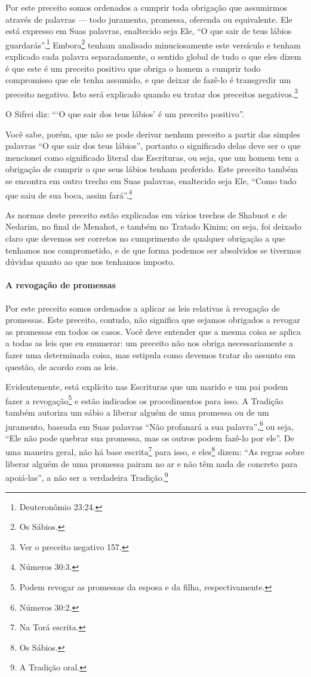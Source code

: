 Por este preceito somos ordenados a cumprir toda obrigação que
assumirmos através de palavras --- todo juramento, promessa, oferenda ou
equivalente. Ele está expresso em Suas palavras, enaltecido seja Ele, ``O
que sair de teus lábios guardarás''.\footnote{Deuteronômio 23:24.}
Embora\footnote{Os Sábios.} tenham analisado minuciosamente este versículo e tenham explicado cada palavra separadamente,
o sentido global de tudo o que eles dizem é que este é um preceito
positivo que obriga o homem a cumprir todo compromisso que ele tenha
assumido, e que deixar de fazê-lo é transgredir um preceito negativo.
Isto será explicado quando eu tratar dos preceitos
negativos.\footnote{Ver o preceito negativo 157.}

O Sifrei diz: ```O que sair dos teus lábios' é um preceito positivo''.

Você sabe, porém, que não se pode derivar nenhum preceito a partir das
simples palavras ``O que sair dos teus lábios'', portanto o significado
delas deve ser o que mencionei como significado literal das Escrituras,
ou seja, que um homem tem a obrigação de cumprir o que seus lábios
tenham proferido. Este preceito também se encontra em outro trecho em
Suas palavras, enaltecido seja Ele, ``Como tudo que saiu de sua boca,
assim fará''.\footnote{Números 30:3.}

As normas deste preceito estão explicadas em vários trechos de Shabuot
e de Nedarim, no final de Menahot, e também no Tratado Kinim; ou seja,
foi deixado claro que devemos ser corretos no cumprimento de qualquer
obrigação a que tenhamos nos comprometido, e de que forma podemos ser
absolvidos se tivermos dúvidas quanto ao que nos tenhamos imposto.

\paragraph{A revogação de promessas}

Por este preceito somos ordenados a aplicar as leis relativas à
revogação de promessas. Este preceito, contudo, não significa que
sejamos obrigados a revogar as promessas em todos os casos. Você deve
entender que a mesma coisa se aplica a todas as leis que eu enumerar:
um preceito não nos obriga necessariamente a fazer uma determinada
coisa, mas estipula como devemos tratar do assunto em questão, de acordo
com as leis.

Evidentemente, está explícito nas Escrituras que um marido e um pai
podem fazer a revogação\footnote{Podem revogar as promessas da esposa e da filha, respectivamente.} e estão indicados os
procedimentos para isso. A Tradição também autoriza um sábio a liberar alguém de uma promessa ou de um
juramento, baseada em Suas palavras ``Não profanará a sua palavra'',\footnote{Números 30:2.} ou seja, ``Ele não pode quebrar sua promessa, mas os outros podem
fazê-lo por ele''. De uma maneira geral, não há base
escrita\footnote{Na Torá escrita.} para isso, e eles\footnote{Os Sábios.} dizem: ``As regras sobre liberar alguém de uma promessa pairam no ar e não têm
nada de concreto para apoiá-las'', a não ser a verdadeira
Tradição.\footnote{A Tradição oral.}

